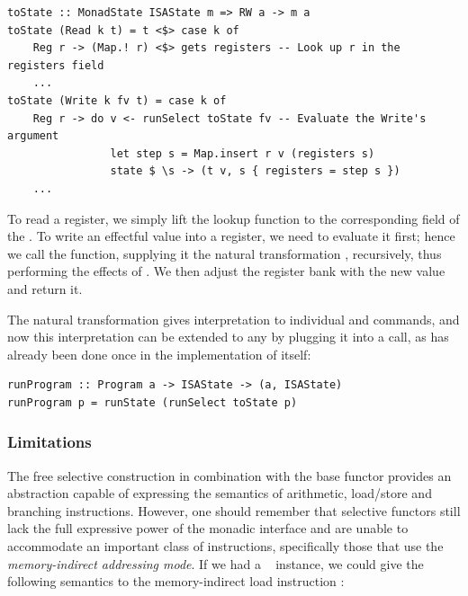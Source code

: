 \vspace{1mm}
\begin{verbatim}
toState :: MonadState ISAState m => RW a -> m a
toState (Read k t) = t <$> case k of
    Reg r -> (Map.! r) <$> gets registers -- Look up r in the registers field
    ...
toState (Write k fv t) = case k of
    Reg r -> do v <- runSelect toState fv -- Evaluate the Write's argument
                let step s = Map.insert r v (registers s)
                state $ \s -> (t v, s { registers = step s })
    ...
\end{verbatim}
\vspace{1mm}

\noindent
To read a register, we simply lift the lookup function  to the
corresponding field of the . To write an effectful value 
into a register, we need to evaluate it first; hence we call the 
function, supplying it the natural transformation , recursively,
thus performing the effects of . We then adjust the register bank with
the new value and return it.

The natural transformation  gives interpretation to individual
 and  commands, and now this interpretation can be extended
to any  by plugging it into a  call, as has already
been done once in the implementation of  itself:

\vspace{1mm}
\begin{verbatim}
runProgram :: Program a -> ISAState -> (a, ISAState)
runProgram p = runState (runSelect toState p)
\end{verbatim}

\subsubsection{Limitations}

The free selective construction in combination with the base functor 
provides an abstraction capable of expressing the semantics of arithmetic,
load/store and branching instructions. However, one should remember that
selective functors still lack the full expressive power of the monadic interface
and are unable to accommodate an important class of instructions, specifically
those that use the \emph{memory-indirect addressing mode}. If we had a
~ instance, we could give the following semantics to the
memory-indirect load instruction :

